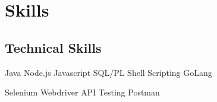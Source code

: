 \documentclass[]{openfont}
\begin{document}
\begin{minipage}[t]{0.33\textwidth}





\section{Skills}
\subsection{Technical Skills}

\textbullet{}Java
\textbullet{}Node.js
\textbullet{}Javascript
\textbullet{}SQL/PL
\textbullet{}Shell Scripting
\textbullet{}GoLang

\textbullet{}Selenium 
\textbullet{}Webdriver
\textbullet{}API Testing
\textbullet{}Postman


\end{minipage}
\end{document}
